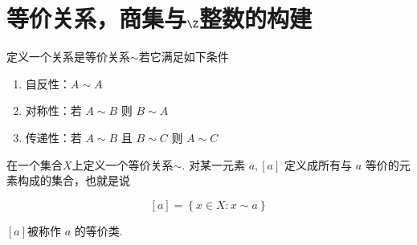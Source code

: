 \section{等价关系，商集与$\Z$整数的构建}
\begin{definition}
	定义一个关系是等价关系$\sim$若它满足如下条件
	\begin{enumerate}
		\item 自反性：$A \sim A$
		\item 对称性：若 $A \sim B$ 则 $B \sim A$
		\item 传递性：若 $A \sim B$ 且 $B \sim C$ 则 $A \sim C$
	\end{enumerate}
	
	
\end{definition}
\begin{definition}
	在一个集合$X$上定义一个等价关系$\sim$.
	对某一元素 $a, \left[a\right]$ 定义成所有与 $a$ 等价的元素构成的集合，也就是说
	
	$$
	[a]=\left\{x \in X: x \sim a\right\}
	$$
	
	$\left[a\right]$被称作 $a$ 的等价类.
\end{definition}

